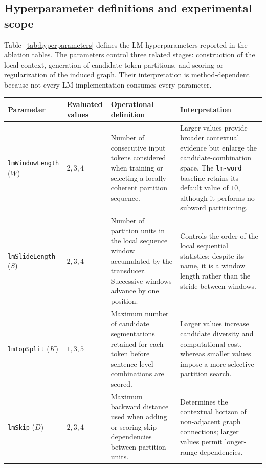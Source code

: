 \subsection{Hyperparameter definitions and experimental scope}

Table~\ref{tab:hyperparameters} defines the LM hyperparameters reported in the
ablation tables. The parameters control three related stages: construction of
the local context, generation of candidate token partitions, and scoring or
regularization of the induced graph. Their interpretation is
method-dependent because not every LM implementation consumes every
parameter.

\begin{table}[t]
  \centering
  \small
  \begin{tabular}{
    p{}
    p{}
    p{}
    p{}
  }
    \hline
    Parameter & Evaluated values & Operational definition &
    Interpretation \\
    \hline
    \texttt{lmWindowLength} ($W$)
    & $2,3,4$
    & Number of consecutive input tokens considered when training or
      selecting a locally coherent partition sequence.
    & Larger values provide broader contextual evidence but enlarge the
      candidate-combination space. The \texttt{lm-word} baseline retains its
      default value of $10$, although it performs no subword partitioning.
      \\

    \texttt{lmSlideLength} ($S$)
    & $2,3,4$
    & Number of partition units in the local sequence window accumulated by
      the transducer. Successive windows advance by one position.
    & Controls the order of the local sequential statistics; despite its
      name, it is a window length rather than the stride between windows.
      \\

    \texttt{lmTopSplit} ($K$)
    & $1,3,5$
    & Maximum number of candidate segmentations retained for each token
      before sentence-level combinations are scored.
    & Larger values increase candidate diversity and computational cost,
      whereas smaller values impose a more selective partition search.
      \\

    \texttt{lmSkip} ($D$)
    & $2,3,4$
    & Maximum backward distance used when adding or scoring skip
      dependencies between partition units.
    & Determines the contextual horizon of non-adjacent graph connections;
      larger values permit longer-range dependencies.
      \\


\end{tabular}
\end{table}

